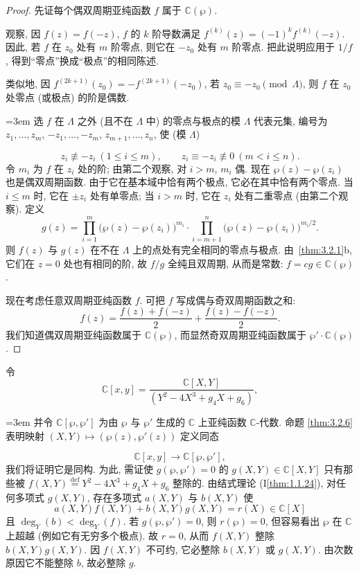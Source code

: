 \begin{proof}
先证每个偶双周期亚纯函数 $f$ 属于 $\mathbb{C}(\wp)$.

观察, 因 $f(z) = f(-z)$, $f$ 的 $k$ 阶导数满足 $f^{(k)}(z) = (-1)^k f^{(k)}(-z)$. 因此, 若 $f$ 在 $z_0$ 处有 $m$ 阶零点, 则它在 $-z_0$ 处有 $m$ 阶零点. 把此说明应用于 $1/f$, 得到``零点''换成``极点''的相同陈述.

类似地, 因 $f^{(2k+1)}(z_0) = -f^{(2k+1)}(-z_0)$, 若 $z_0\equiv-z_0\pmod{\Lambda}$, 则 $f$ 在 $z_0$ 处零点 (或极点) 的阶是偶数.

{\emergencystretch=3em 选 $f$ 在 $\Lambda$ 之外 (且不在 $\Lambda$ 中) 的零点与极点的模 $\Lambda$ 代表元集, 编号为 $z_1, \dots, z_m$, $-z_1, \dots, -z_m$, $z_{m+1}, \dots, z_n$, 使 (模 $\Lambda$)\par}
\[
z_i\not\equiv -z_i \ (1\le i\le m), \qquad z_i\equiv -z_i\not\equiv 0 \ (m < i\le n).
\]
令 $m_i$ 为 $f$ 在 $z_i$ 处的阶; 由第二个观察, 对 $i > m$, $m_i$ 偶. 现在 $\wp(z) - \wp(z_i)$ 也是偶双周期函数. 由于它在基本域中恰有两个极点, 它必在其中恰有两个零点. 当 $i\le m$ 时, 它在 $\pm z_i$ 处有单零点; 当 $i > m$ 时, 它在 $z_i$ 处有二重零点 (由第二个观察). 定义
\[
g(z) = \prod_{i=1}^{m}\bigl(\wp(z) - \wp(z_i)\bigr)^{m_i}\cdot\prod_{i=m+1}^{n}\bigl(\wp(z) - \wp(z_i)\bigr)^{m_i/2}.
\]
则 $f(z)$ 与 $g(z)$ 在不在 $\Lambda$ 上的点处有完全相同的零点与极点. 由~\ref{thm:3.2.1}b, 它们在 $z = 0$ 处也有相同的阶, 故 $f/g$ 全纯且双周期, 从而是常数: $f = cg\in\mathbb{C}(\wp)$.

现在考虑任意双周期亚纯函数 $f$. 可把 $f$ 写成偶与奇双周期函数之和:
\[
f(z) = \frac{f(z) + f(-z)}{2} + \frac{f(z) - f(-z)}{2}.
\]
我们知道偶双周期亚纯函数属于 $\mathbb{C}(\wp)$, 而显然奇双周期亚纯函数属于 $\wp'\cdot\mathbb{C}(\wp)$.
\end{proof}

令
\[
\mathbb{C}[x, y] = \frac{\mathbb{C}[X, Y]}{(Y^2 - 4X^3 + g_4X + g_6)},
\]
{\emergencystretch=3em 并令 $\mathbb{C}[\wp, \wp']$ 为由 $\wp$ 与 $\wp'$ 生成的 $\mathbb{C}$ 上亚纯函数 $\mathbb{C}$-代数. 命题 \ref{thm:3.2.6} 表明映射 $(X, Y)\mapsto(\wp(z), \wp'(z))$ 定义同态\par}
\[
\mathbb{C}[x, y]\to\mathbb{C}[\wp, \wp'],
\]
我们将证明它是同构. 为此, 需证使 $g(\wp, \wp') = 0$ 的 $g(X, Y)\in\mathbb{C}[X, Y]$ 只有那些被 $f(X, Y) \overset{\text{def}}{=} Y^2 - 4X^3 + g_4X + g_6$ 整除的. 由结式理论 (I\ref{thm:1.1.24}), 对任何多项式 $g(X, Y)$, 存在多项式 $a(X, Y)$ 与 $b(X, Y)$ 使
\[
a(X, Y)f(X, Y) + b(X, Y)g(X, Y) = r(X)\in\mathbb{C}[X]
\]
且 $\deg_Y(b) < \deg_Y(f)$. 若 $g(\wp, \wp') = 0$, 则 $r(\wp) = 0$, 但容易看出 $\wp$ 在 $\mathbb{C}$ 上超越 (例如它有无穷多个极点). 故 $r = 0$, 从而 $f(X, Y)$ 整除 $b(X, Y)g(X, Y)$. 因 $f(X, Y)$ 不可约, 它必整除 $b(X, Y)$ 或 $g(X, Y)$. 由次数原因它不能整除 $b$, 故必整除 $g$.

